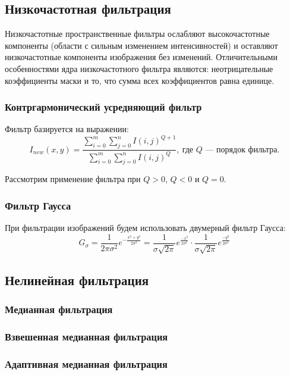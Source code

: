 \subsection{Низкочастотная фильтрация}
Низкочастотные пространственные фильтры ослабляют высокочастотные компоненты (области с сильным изменением интенсивностей) и оставляют низкочастотные компоненты изображения
без изменений. Отличительными особенностями
ядра низкочастотного фильтра являются: неотрицательные коэффициенты маски и то, что сумма всех коэффициентов равна единице.

\subsubsection{Контргармонический усредняющий фильтр}
Фильтр базируется на выражении:
\begin{equation}
    I_{new}(x,y) = \frac{\sum_{i=0}^m \sum_{j=0}^n I(i,j)^{Q+1}}{\sum_{i=0}^m \sum_{j=0}^n I(i,j)^Q}, \: \text{где $Q$ — порядок фильтра.}
\end{equation}


Рассмотрим применение фильтра при $Q > 0$, $Q < 0$ и
$Q = 0$.

\newpage

\subsubsection{Фильтр Гаусса}
При фильтрации изображений будем использовать двумерный фильтр Гаусса:
\begin{equation}
   G_\sigma = \frac{1}{2\pi\sigma^2} e^{-\frac{x^2+y^2}{2\sigma^2}} = \frac{1}{\sigma\sqrt{2\pi}} e^{\frac{-x^2}{2\sigma^2}} \cdot \frac{1}{\sigma\sqrt{2\pi}} e^{\frac{-y^2}{2\sigma^2}}
\end{equation}


\subsection{Нелинейная фильтрация}
\subsubsection{Медианная фильтрация}

\subsubsection{Взвешенная медианная фильтрация}
\subsubsection{Адаптивная медианная фильтрация}
